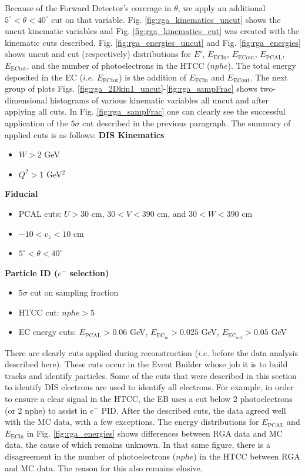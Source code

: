Because of the Forward Detector's coverage in $\theta$, we apply an additional $5^{\circ} < \theta < 40^{\circ}$ cut on that variable. Fig. \ref{fig:rga_kinematics_uncut} shows the uncut kinematic variables and Fig. \ref{fig:rga_kinematics_cut} was created with the kinematic cuts described. Fig. \ref{fig:rga_energies_uncut} and Fig. \ref{fig:rga_energies} shows uncut and cut (respectively) distributions for $E'$, $E_{\mathrm{ECin}}$, $E_{\mathrm{ECout}}$, $E_{\mathrm{PCAL}}$, $E_{\mathrm{ECtot}}$, and the number of photoelectrons in the HTCC ($nphe$). The total energy deposited in the EC ($i.e.$ $E_{\mathrm{ECtot}}$) is the addition of $E_{\mathrm{ECin}}$ and $E_{\mathrm{ECout}}$. The next group of plots Figs. \ref{fig:rga_2Dkin1_uncut}-\ref{fig:rga_sampFrac} shows two-dimensional histograms of various kinematic variables all uncut and after applying all cuts. In Fig. \ref{fig:rga_sampFrac} one can clearly see the successful application of the $5\sigma$ cut described in the previous paragraph. The summary of applied cuts is as follows:
\newpage
\noindent
\textbf{DIS Kinematics}
\begin{itemize}
	\item $W>2$ GeV
	\item $Q^2>1$ GeV$^2$
\end{itemize}
\textbf{Fiducial}
\begin{itemize}
	\item PCAL cuts: $U>30$ cm, $30<V<390$ cm, and $30<W<390$ cm
	\item $-10<v_z<10$ cm
	\item $5^{\circ} < \theta < 40^{\circ}$
\end{itemize}
\textbf{Particle ID ($e^-$ selection)}
\begin{itemize}
	\item $5\sigma$ cut on sampling fraction
	\item HTCC cut: $nphe > 5$
	\item EC energy cuts: $E_{\mathrm{PCAL}} > 0.06$ GeV, $E_{\mathrm{EC_{in}}} > 0.025$ GeV, $E_{\mathrm{EC_{out}}} > 0.05$ GeV
\end{itemize}

There are clearly cuts applied during reconstruction ($i.e.$ before the data analysis described here). These cuts occur in the Event Builder whose job it is to build tracks and identify particles. Some of the cuts that were described in this section to identify DIS electrons are used to identify all electrons. For example, in order to ensure a clear signal in the HTCC, the EB uses a cut below 2 photoelectrons (or 2 nphe) to assist in $e^-$ PID. After the described cuts, the data agreed well with the MC data, with a few exceptions. The energy distributions for $E_{\mathrm{PCAL}}$ and $E_{\mathrm{ECin}}$ in Fig. \ref{fig:rga_energies} shows differences between RGA data and MC data, the cause of which remains unknown. In that same figure, there is a disagreement in the number of photoelectrons ($nphe$) in the HTCC between RGA and MC data. The reason for this also remains elusive.

